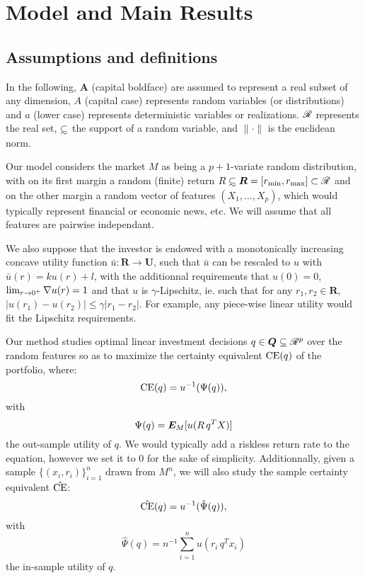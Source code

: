 \section{Model and Main Results}

\subsection{Assumptions and definitions}


 In the following, $\bm A$ (capital boldface) are assumed to represent
a real subset of any dimension, $A$ (capital case) represents random variables (or
distributions) and $a$ (lower case) represents deterministic variables or
realizations. $\mathscr{R}$ represents the real set, $\subsetsim$ the support of a random
variable, and $\|\cdot\|$ is the euclidean norm.

Our model considers the market $M$ as being a $p+1$-variate random distribution, with on
its first margin a random (finite) return
$R\subsetsim\bm R=[r_{\min},r_{\max}]\subset\real$  and on the other
margin a random vector of features $(X_1,\dots,X_p)$, which would typically represent
financial or economic news, etc. We will assume that all features are pairwise
independant.

We also suppose that the investor is endowed with a monotonically increasing concave
utility function $\bar u:\bm R\to\bm U$, such that $\bar u$ can be rescaled to $u$ with
$\bar u(r) = ku(r) + l$, with the additionnal requirements that $u(0)=0$,
$\lim_{r\to0^+}\nabla u(r) = 1$ and that $u$ is $\gamma$-Lipschitz, ie. such that for any
$r_1,r_2\in\bm R$, $|u(r_1) - u(r_2)| \leq \gamma|r_1-r_2|$. For example, any piece-wise
linear utility would fit the Lipschitz requirements.

Our method studies optimal linear investment decisions $q\in\bm Q\subseteq\mathscr{R}^p$ over
the random features so as to maximize the certainty equivalent $\operatorname{CE}(q)$ of the portfolio,
where:
\[
  \operatorname{CE}(q) = u^{-1}(\Psi(q)),
\]
with
\[
  \Psi(q) = \bm E_M[u(R\,q^TX)]
\]
the out-sample utility of $q$. We would typically add a riskless return rate to the
equation, however we set it to 0 for the sake of simplicity. Additionnally, given a sample
$\{(x_i,r_i)\}_{i=1}^n$ drawn from $M^n$, we will also study the sample certainty
equivalent $\hat{\operatorname{CE}}$:
\[
  \hat{\operatorname{CE}}(q) = u^{-1}(\hat\Psi(q)),
\]
with
\[
  \hat\Psi(q) = n^{-1}\sum_{i=1}^n u(r_i\,q^Tx_i)
\]
the in-sample utility of $q$. 

